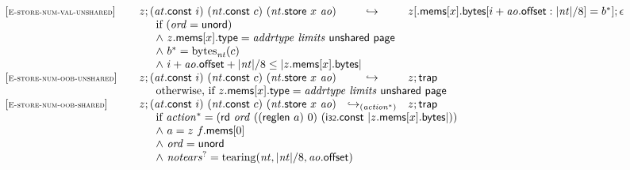 $$
\begin{array}[t]{@{}lrcl@{}l@{}}
{[\textsc{\scriptsize E{-}store{-}num{-}val{-}unshared}]} \quad & z ; ({\mathit{at}}{.}\mathsf{const}~i)~({\mathit{nt}}{.}\mathsf{const}~c)~({\mathit{nt}}{.}\mathsf{store}~x~{\mathit{ao}}) & \hookrightarrow & z{}[{.}\mathsf{mems}{}[x]{.}\mathsf{bytes}{}[i + {\mathit{ao}}{.}\mathsf{offset} : {|{\mathit{nt}}|} / 8] = {b^\ast}] ; \epsilon &  \\
& \multicolumn{4}{@{}l@{}}{\quad
\quad
\begin{array}[t]{@{}l@{}}
\mbox{if}~ ({\mathit{ord}} = \mathsf{unord}) \\
{\land}~ z{.}\mathsf{mems}{}[x]{.}\mathsf{type} = {\mathit{addrtype}}~{\mathit{limits}}~\mathsf{unshared}~\mathsf{page} \\
{\land}~ {b^\ast} = {{\mathrm{bytes}}}_{{\mathit{nt}}}(c) \\
{\land}~ i + {\mathit{ao}}{.}\mathsf{offset} + {|{\mathit{nt}}|} / 8 \leq {|z{.}\mathsf{mems}{}[x]{.}\mathsf{bytes}|} \\
\end{array}
} \\
{[\textsc{\scriptsize E{-}store{-}num{-}oob{-}unshared}]} \quad & z ; ({\mathit{at}}{.}\mathsf{const}~i)~({\mathit{nt}}{.}\mathsf{const}~c)~({\mathit{nt}}{.}\mathsf{store}~x~{\mathit{ao}}) & \hookrightarrow & z ; \mathsf{trap} &  \\
& \multicolumn{4}{@{}l@{}}{\quad
\quad \mbox{otherwise, if}~ z{.}\mathsf{mems}{}[x]{.}\mathsf{type} = {\mathit{addrtype}}~{\mathit{limits}}~\mathsf{unshared}~\mathsf{page}
} \\
{[\textsc{\scriptsize E{-}store{-}num{-}oob{-}shared}]} \quad & z ; ({\mathit{at}}{.}\mathsf{const}~i)~({\mathit{nt}}{.}\mathsf{const}~c)~({\mathit{nt}}{.}\mathsf{store}~x~{\mathit{ao}}) & {\hookrightarrow}_{({{\mathit{action}}^\ast})} {} & z ; \mathsf{trap} &  \\
& \multicolumn{4}{@{}l@{}}{\quad
\quad
\begin{array}[t]{@{}l@{}}
\mbox{if}~ {{\mathit{action}}^\ast} = (\mathsf{rd}~{\mathit{ord}}~((\mathsf{reglen}~a)~0)~(\mathsf{i{\scriptstyle 32}}{.}\mathsf{const}~{|z{.}\mathsf{mems}{}[x]{.}\mathsf{bytes}|})) \\
{\land}~ a = z~f{.}\mathsf{mems}{}[0] \\
{\land}~ {\mathit{ord}} = \mathsf{unord} \\
{\land}~ {{\mathit{notears}}^?} = {\mathrm{tearing}}({\mathit{nt}}, {|{\mathit{nt}}|} / 8, {\mathit{ao}}{.}\mathsf{offset}) \\

\end{array}}
\end{array}$$

